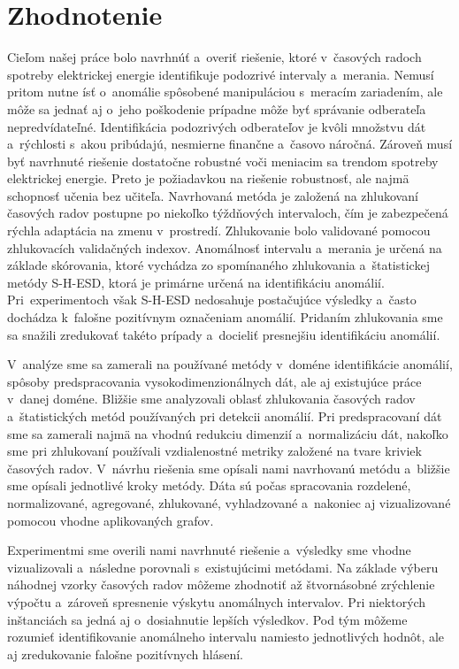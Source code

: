 \documentclass[a4paper,twoside,slovak,12pt,appendix]{article}
\begin{document}
\newpage
\section{Zhodnotenie}
\label{c:evaluation}
Cieľom našej práce bolo navrhnúť a~overiť riešenie, ktoré v~časových radoch
spotreby elektrickej energie identifikuje podozrivé intervaly a~merania. Nemusí
pritom nutne ísť o~anomálie spôsobené manipuláciou s~meracím zariadením, ale
môže sa jednať aj o~jeho poškodenie prípadne môže byť správanie odberateľa
nepredvídateľné. Identifikácia podozrivých odberateľov je kvôli množstvu dát
a~rýchlosti s~akou pribúdajú, nesmierne finančne a~časovo náročná. Zároveň musí
byť navrhnuté riešenie dostatočne robustné voči meniacim sa trendom spotreby
elektrickej energie. Preto je požiadavkou na riešenie robustnosť, ale najmä
schopnosť učenia bez učiteľa. Navrhovaná metóda je založená na zhlukovaní
časových radov postupne po niekoľko týždňových intervaloch, čím je zabezpečená
rýchla adaptácia na zmenu v~prostredí. Zhlukovanie bolo validované pomocou
zhlukovacích validačných indexov. Anomálnosť intervalu a~merania je určená na
základe skórovania, ktoré vychádza zo spomínaného zhlukovania a~štatistickej
metódy S-H-ESD, ktorá je primárne určená na identifikáciu anomálií.
Pri~experimentoch však S-H-ESD nedosahuje postačujúce výsledky a~často dochádza
k~falošne pozitívnym označeniam anomálií. Pridaním zhlukovania sme sa snažili
zredukovať takéto prípady a~docieliť presnejšiu identifikáciu anomálií.

V~analýze sme sa zamerali na používané metódy v~doméne identifikácie anomálií,
spôsoby predspracovania vysokodimenzionálnych dát, ale aj existujúce práce
v~danej doméne. Bližšie sme analyzovali oblasť zhlukovania časových radov
a~štatistických metód používaných pri detekcii anomálií. Pri predspracovaní dát
sme sa zamerali najmä na vhodnú redukciu dimenzií a~normalizáciu dát, nakoľko
sme pri zhlukovaní používali vzdialenostné metriky založené na tvare kriviek
časových radov. V~návrhu riešenia sme opísali nami navrhovanú metódu a~bližšie
sme opísali jednotlivé kroky metódy. Dáta sú počas spracovania rozdelené,
normalizované, agregované, zhlukované, vyhladzované a~nakoniec aj vizualizované
pomocou vhodne aplikovaných grafov.

Experimentmi sme overili nami navrhnuté riešenie a~výsledky sme vhodne
vizualizovali a~následne porovnali s~existujúcimi metódami. Na základe výberu
náhodnej vzorky časových radov môžeme zhodnotiť až štvornásobné zrýchlenie
výpočtu a~zároveň spresnenie výskytu anomálnych intervalov. Pri niektorých
inštanciách sa jedná aj o~dosiahnutie lepších výsledkov. Pod tým môžeme rozumieť
identifikovanie anomálneho intervalu namiesto jednotlivých hodnôt, ale aj
zredukovanie falošne pozitívnych hlásení.
\end{document}
